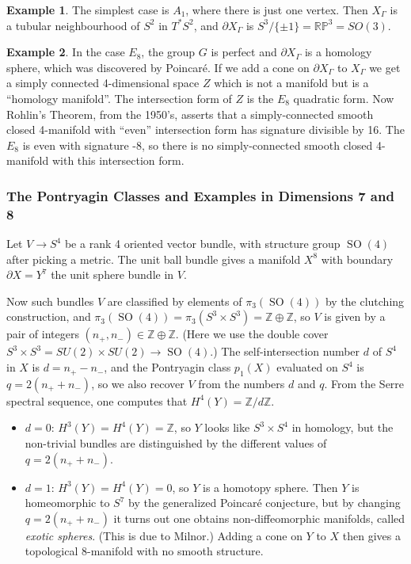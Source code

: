 \documentclass{article}
\theoremstyle{definition}
\newtheorem*{example}{Example}
\DeclareMathOperator{\SO}{SO}
\newcommand{\RP}{\mathbb{RP}}
\newcommand{\Z}{\mathbb{Z}}
\begin{document}
\begin{example}
    The simplest case is $A_1$, where there is just one vertex. Then $X_\Gamma$
    is a tubular neighbourhood of $S^2$ in $T^*S^2$, and $\partial X_\Gamma$ is
    $S^3/\{\pm1\}=\RP^3=SO(3)$.
\end{example}

\begin{example}
    In the case $E_8$, the group $G$ is perfect and $\partial X_\Gamma$ is a 
    homology sphere, which was discovered by Poincar\'e. If we add a cone on
    $\partial X_\Gamma$ to $X_\Gamma$ we get a simply connected 4-dimensional
    space $Z$ which is not a manifold but is a ``homology manifold''. The
    intersection form of $Z$ is the $E_8$ quadratic form. Now Rohlin's Theorem,
    from the 1950's, asserts that a simply-connected smooth closed 4-manifold
    with ``even'' intersection form has signature divisible by 16. The $E_8$
    is even with signature -8, so there is no simply-connected smooth closed
    4-manifold with this intersection form.
\end{example}

\subsubsection*{The Pontryagin Classes and Examples in Dimensions 7 and 8}

Let $V\to S^4$ be a rank 4 oriented vector bundle, with structure group $\SO(4)$
after picking a metric. The unit ball bundle gives a manifold $X^8$ with
boundary $\partial X=Y^7$ the unit sphere bundle in $V$.

Now such bundles $V$ are classified by elements of $\pi_3(\SO(4))$ by the
clutching construction, and $\pi_3(\SO(4))=\pi_3(S^3\times S^3)=\Z\oplus\Z$, so
$V$ is given by a pair of integers $(n_+,n_-)\in\Z\oplus\Z$. (Here we use the
double cover $S^3\times S^3=SU(2)\times SU(2)\to\SO(4)$.) The self-intersection
number $d$ of $S^4$ in $X$ is $d=n_+-n_-$, and the Pontryagin class $p_1(X)$
evaluated on $S^4$ is $q=2(n_++n_-)$, so we also recover $V$ from the numbers
$d$ and $q$. From the Serre spectral sequence, one computes that
$H^4(Y)=\Z/d\Z$.
\begin{itemize}
    \item $d=0$: $H^3(Y)=H^4(Y)=\Z$, so $Y$ looks like $S^3\times S^4$ in
        homology, but the non-trivial bundles are distinguished by the different
        values of $q=2(n_++n_-)$.

    \item $d=1$: $H^3(Y)=H^4(Y)=0$, so $Y$ is a homotopy sphere. Then $Y$ is
        homeomorphic to $S^7$ by the generalized Poincar\'e conjecture, but by
        changing $q=2(n_++n_-)$ it turns out one obtains non-diffeomorphic
        manifolds, called \emph{exotic spheres}. (This is due to Milnor.) Adding
        a cone on $Y$ to $X$ then gives a topological 8-manifold with no smooth
        structure.
\end{itemize}
\end{document}
